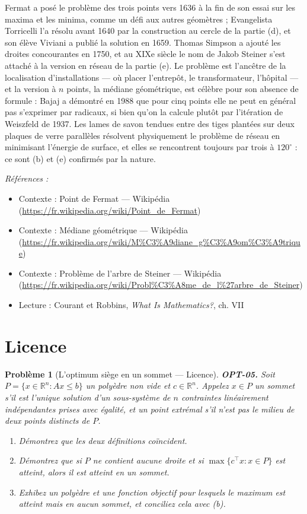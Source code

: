 \documentclass[11pt]{article}
\newtheorem{problem}{Problème}
\newenvironment{refs}{\par\small\noindent\emph{Références :}\begin{itemize}\setlength\itemsep{0pt}}{\end{itemize}\normalsize}
\begin{document}
\noindent Fermat a posé le problème des trois points vers 1636 à la fin de son essai sur les maxima et les minima, comme un défi aux autres géomètres ; Evangelista Torricelli l'a résolu avant 1640 par la construction au cercle de la partie (d), et son élève Viviani a publié la solution en 1659. Thomas Simpson a ajouté les droites concourantes en 1750, et au XIXe siècle le nom de Jakob Steiner s'est attaché à la version en réseau de la partie (e). Le problème est l'ancêtre de la localisation d'installations --- où placer l'entrepôt, le transformateur, l'hôpital --- et la version à $n$ points, la médiane géométrique, est célèbre pour son absence de formule : Bajaj a démontré en 1988 que pour cinq points elle ne peut en général pas s'exprimer par radicaux, si bien qu'on la calcule plutôt par l'itération de Weiszfeld de 1937. Les lames de savon tendues entre des tiges plantées sur deux plaques de verre parallèles résolvent physiquement le problème de réseau en minimisant l'énergie de surface, et elles se rencontrent toujours par trois à $120^\circ$ : ce sont (b) et (e) confirmés par la nature.

\begin{refs}
\item Contexte : Point de Fermat --- Wikipédia (\url{https://fr.wikipedia.org/wiki/Point_de_Fermat})
\item Contexte : Médiane géométrique --- Wikipédia (\url{https://fr.wikipedia.org/wiki/M%C3%A9diane_g%C3%A9om%C3%A9trique})
\item Contexte : Problème de l'arbre de Steiner --- Wikipédia (\url{https://fr.wikipedia.org/wiki/Probl%C3%A8me_de_l%27arbre_de_Steiner})
\item Lecture : Courant et Robbins, \textit{What Is Mathematics?}, ch. VII
\end{refs}

\bigskip


\section*{Licence}

\begin{problem}[{L'optimum siège en un sommet --- Licence}]
\textbf{OPT-05.} Soit $P = \{x \in \mathbb{R}^n : Ax \le b\}$ un polyèdre non vide et $c \in \mathbb{R}^n$. Appelez $x \in P$ un \textit{sommet} s'il est l'unique solution d'un sous-système de $n$ contraintes linéairement indépendantes prises avec égalité, et un \textit{point extrémal} s'il n'est pas le milieu de deux points distincts de $P$.
\begin{enumerate}
\item[(a)] Démontrez que les deux définitions coïncident.
\item[(b)] Démontrez que si $P$ ne contient aucune droite et si $\max\{c^\top x : x \in P\}$ est atteint, alors il est atteint en un sommet.
\item[(c)] Exhibez un polyèdre et une fonction objectif pour lesquels le maximum est atteint mais en aucun sommet, et conciliez cela avec (b).
\end{enumerate}

\end{problem}
\end{document}
